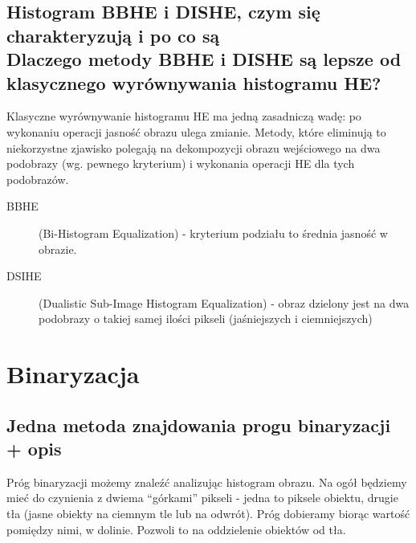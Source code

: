 \documentclass[a4paper, 12pt, titlepage]{article}
\begin{document}
\subsection{Histogram BBHE i DISHE, czym się charakteryzują i po co są \\ Dlaczego metody BBHE i DISHE są lepsze od klasycznego wyrównywania histogramu HE?}
Klasyczne wyrównywanie histogramu HE ma jedną zasadniczą wadę: po wykonaniu operacji
jasność obrazu ulega zmianie. Metody, które eliminują to niekorzystne zjawisko polegają na dekompozycji obrazu wejściowego na dwa podobrazy (wg. pewnego kryterium) i wykonania operacji HE dla tych podobrazów. 
\begin{description}
	\item[BBHE] (Bi-Histogram Equalization) - kryterium podziału to średnia jasność w obrazie.
	\item[DSIHE] (Dualistic Sub-Image Histogram Equalization) - obraz dzielony jest na dwa podobrazy o takiej samej ilości pikseli (jaśniejszych i ciemniejszych) 
\end{description}

\pagebreak\section{Binaryzacja}

\subsection{Jedna metoda znajdowania progu binaryzacji + opis}
Próg binaryzacji możemy znaleźć analizując histogram obrazu. Na ogół będziemy mieć do czynienia z dwiema “górkami” pikseli - jedna to piksele obiektu, drugie tła (jasne obiekty na ciemnym tle lub na odwrót). Próg dobieramy biorąc wartość pomiędzy nimi, w dolinie. Pozwoli to na oddzielenie obiektów od tła.
\end{document}
